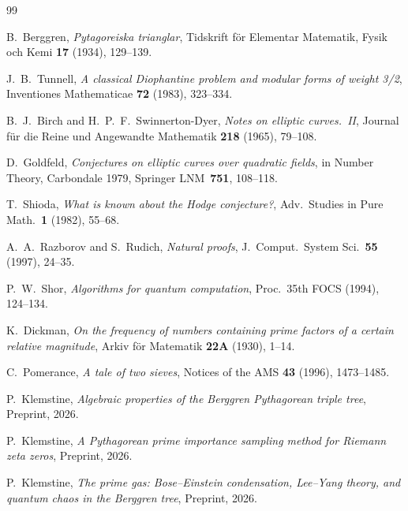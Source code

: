 \documentclass[12pt]{amsart}
\theoremstyle{definition}
\theoremstyle{remark}
\begin{document}
\begin{thebibliography}{99}

B.~Berggren,
\emph{Pytagoreiska trianglar},
Tidskrift f\"or Elementar Matematik, Fysik och Kemi \textbf{17} (1934), 129--139.

J.~B.~Tunnell,
\emph{A classical Diophantine problem and modular forms of weight 3/2},
Inventiones Mathematicae \textbf{72} (1983), 323--334.

B.~J.~Birch and H.~P.~F.~Swinnerton-Dyer,
\emph{Notes on elliptic curves.\ II},
Journal f\"ur die Reine und Angewandte Mathematik \textbf{218} (1965), 79--108.

D.~Goldfeld,
\emph{Conjectures on elliptic curves over quadratic fields},
in Number Theory, Carbondale 1979, Springer LNM~\textbf{751}, 108--118.

T.~Shioda,
\emph{What is known about the Hodge conjecture?},
Adv.\ Studies in Pure Math.\ \textbf{1} (1982), 55--68.

A.~A.~Razborov and S.~Rudich,
\emph{Natural proofs},
J.\ Comput.\ System Sci.\ \textbf{55} (1997), 24--35.

P.~W.~Shor,
\emph{Algorithms for quantum computation},
Proc.\ 35th FOCS (1994), 124--134.

K.~Dickman,
\emph{On the frequency of numbers containing prime factors of a certain
relative magnitude},
Arkiv f\"or Matematik \textbf{22A} (1930), 1--14.

C.~Pomerance,
\emph{A tale of two sieves},
Notices of the AMS \textbf{43} (1996), 1473--1485.

P.~Klemstine,
\emph{Algebraic properties of the Berggren Pythagorean triple tree},
Preprint, 2026.

P.~Klemstine,
\emph{A Pythagorean prime importance sampling method for Riemann zeta zeros},
Preprint, 2026.

P.~Klemstine,
\emph{The prime gas: Bose--Einstein condensation, Lee--Yang theory, and
quantum chaos in the Berggren tree},
Preprint, 2026.

\end{thebibliography}
\end{document}
